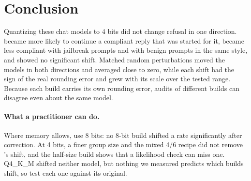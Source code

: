 \section{Conclusion}
Quantizing these chat models to 4 bits did not change refusal in one direction. \qwen{} became more likely to continue a compliant reply that was started for it, \llama{} became less compliant with jailbreak prompts and with benign prompts in the same style, and \qwenthree{} showed no significant shift. Matched random perturbations moved the models in both directions and averaged close to zero, while each shift had the sign of the real rounding error and grew with its scale over the tested range. Because each build carries its own rounding error, audits of different builds can disagree even about the same model.

\paragraph{What a practitioner can do.}
Where memory allows, use 8 bits: no 8-bit build shifted a rate significantly after correction. At 4 bits, a finer group size and the mixed 4/6 recipe did not remove \qwen's shift, and the half-size \llama{} build shows that a likelihood check can miss one. Q4\_K\_M shifted neither model, but nothing we measured predicts which builds shift, so test each one against its original.

